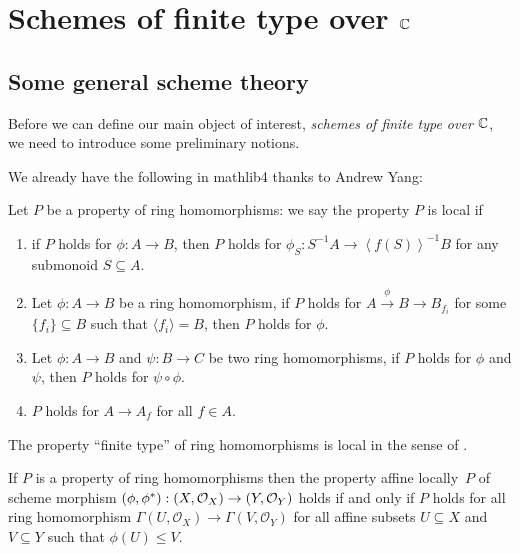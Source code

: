 \chapter{Schemes of finite type over $\mathbb{C}$}

\section{Some general scheme theory}

Before we can define our main object of interest, {\em schemes of finite type over $\mathbb{C}$}, we need to introduce some preliminary notions.

We already have the following in {\sf mathlib4} thanks to Andrew Yang:
\begin{definition}\label{def:ring-hom-prop-local}
  Let $P$ be a property of ring homomorphisms:
    we say the property $P$ is local if
    \begin{enumerate}
      \item if $P$ holds for $\phi : A \to B$, then $P$ holds for $\phi_S: S^{-1}A \to \left\langle f(S)\right\rangle^{-1} B$ for any submonoid $S \subseteq A$.
      \item Let $\phi : A \to B$ be a ring homomorphism, if $P$ holds for $A \stackrel{\phi}{\to} B \to B_{f_i}$ for some $\{f_i\} \subseteq B$ such that $\langle f_i\rangle = B$, then $P$ holds for $\phi$.
      \item Let $\phi : A \to B$ and $\psi : B \to C$ be two ring homomorphisms, if $P$ holds for $\phi$ and $\psi$, then $P$ holds for $\psi \circ \phi$.
      \item $P$ holds for $A \to A_f$ for all $f \in A$.
    \end{enumerate}
\end{definition}

\begin{proposition}
  The property ``finite type'' of ring homomorphisms is local in the sense of .
\end{proposition}

\begin{definition}
  If $P$ is a property of ring homomorphisms then the property {\rm affine locally}~$P$ of scheme morphism $(\phi, \phi^*): \left(X, \mathcal{O}_{X}\right) \to \left(Y, \mathcal{O}_{Y}\right)$ holds if and only if $P$ holds for all ring homomorphism $\Gamma(U, \mathscr{O}_X) \to \Gamma(V, \mathscr{O}_Y)$ for all affine subsets $U \subseteq X$ and $V \subseteq Y$ such that $\phi(U) \le V$.

\end{definition}

